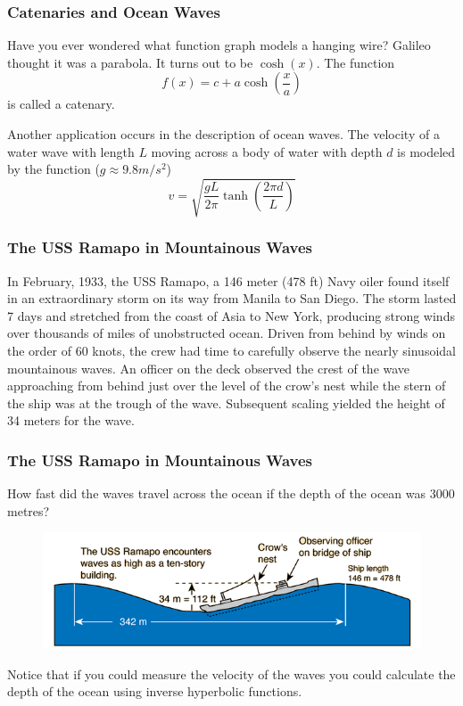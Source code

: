 \documentclass[xcolor=dvipsnames]{beamer}
\begin{document}
\begin{frame}
  \frametitle{Catenaries and Ocean Waves}
   Have you ever wondered what function graph
  models a hanging wire? Galileo thought it was a parabola. It turns
  out to be $\cosh(x)$. The function
  \begin{equation}
    \label{eq:keechieg}
    f(x)=c+a\cosh\left(\frac{x}{a}\right)
  \end{equation}
  is called a \alert{catenary}.

  \bigskip

   Another application occurs in the description
  of ocean waves. The velocity of a water wave with length $L$ moving
  across a body of water with depth $d$ is modeled by the function
  ($g\approx{}9.8m/s^{2}$)
  \begin{equation}
    \label{eq:oghaivae}
    v=\sqrt{\frac{gL}{2\pi}\tanh\left(\frac{2\pi{}d}{L}\right)}
  \end{equation}
\end{frame}

\begin{frame}
  \frametitle{The USS Ramapo in Mountainous Waves}
   In February, 1933, the USS Ramapo, a 146 meter
  (478 ft) Navy oiler found itself in an extraordinary storm on its
  way from Manila to San Diego. The storm lasted 7 days and stretched
  from the coast of Asia to New York, producing strong winds over
  thousands of miles of unobstructed ocean. Driven from behind by
  winds on the order of 60 knots, the crew had time to carefully
  observe the nearly sinusoidal mountainous waves. An officer on the
  deck observed the crest of the wave approaching from behind just
  over the level of the crow's nest while the stern of the ship was at
  the trough of the wave. Subsequent scaling yielded the height of 34
  meters for the wave.
\end{frame}

\begin{frame}
  \frametitle{The USS Ramapo in Mountainous Waves}
How fast did the waves travel across the ocean if the depth of the ocean
  was 3000 metres?
\begin{figure}[h]
\includegraphics[scale=.5]{./diagrams/ramapo.png}
\end{figure}
Notice that if you could measure the velocity of the waves you could
calculate the depth of the ocean using \alert{inverse hyperbolic
  functions}.
\end{frame}
\end{document}

